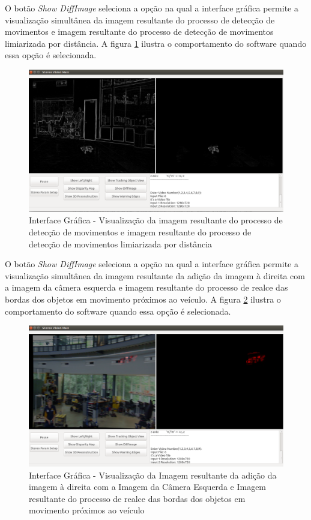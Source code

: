 O botão \textit{Show DiffImage} seleciona a opção na qual a interface gráfica permite a visualização simultânea da imagem resultante do processo de detecção de movimentos e imagem resultante do 
processo de detecção de movimentos limiarizada por distância. A figura \ref{gui_showdiffimage_view} ilustra o comportamento do software quando essa opção é selecionada. 

\begin{figure}[H]
 	\centering
 	\includegraphics[scale=0.35]{./Resources/gui_showdiffimage_view.png}
 	\caption{Interface Gráfica - Visualização da imagem resultante do processo de detecção de movimentos e imagem resultante do processo de detecção de movimentos limiarizada por distância}
 	\label{gui_showdiffimage_view}
\end{figure}

O botão \textit{Show DiffImage} seleciona a opção na qual a interface gráfica permite a visualização simultânea da imagem resultante da adição da imagem à direita com a imagem da câmera esquerda 
e imagem resultante do processo de realce das bordas dos objetos em movimento próximos ao veículo. A figura \ref{gui_showwarningedges_view} ilustra o comportamento do software quando essa opção 
é selecionada. 

\begin{figure}[H]
 	\centering
 	\includegraphics[scale=0.35]{./Resources/gui_showwarningedges_view.png}
 	\caption{Interface Gráfica - Visualização da Imagem resultante da adição da imagem à direita com a Imagem da Câmera Esquerda e Imagem resultante do processo de realce das bordas dos 
 	objetos em movimento próximos ao veículo}
 	\label{gui_showwarningedges_view}
\end{figure}


